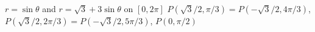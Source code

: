 {$r=\sin\theta$ and $r=\sqrt{3}+3\sin\theta$ on $[0,2\pi]$}
{$P(\sqrt{3}/2,\pi/3)=P(-\sqrt{3}/2,4\pi/3)$, $P(\sqrt{3}/2,2\pi/3)=P(-\sqrt{3}/2,5\pi/3)$, $P(0,\pi/2)$
}
